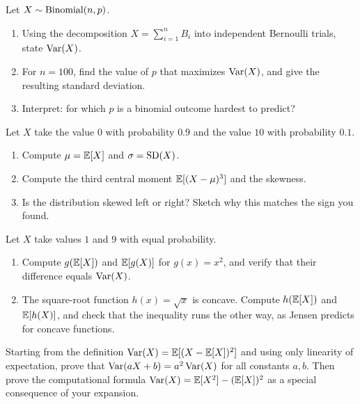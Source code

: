 \begin{exercise}
\label{ch09:exr-binom}
Let $X \sim \operatorname{Binomial}(n,p)$.
\begin{enumerate}
  \item Using the decomposition $X = \sum_{i=1}^n B_i$ into independent
        Bernoulli trials, state $\operatorname{Var}(X)$.
  \item For $n = 100$, find the value of $p$ that maximizes $\operatorname{Var}(X)$, and
        give the resulting standard deviation.
  \item Interpret: for which $p$ is a binomial outcome hardest to predict?
\end{enumerate}
\end{exercise}

\begin{exercise}
\label{ch09:exr-skew}
Let $X$ take the value $0$ with probability $0.9$ and the value $10$ with
probability $0.1$.
\begin{enumerate}
  \item Compute $\mu = \operatorname{\mathbb{E}}[X]$ and $\sigma = \operatorname{SD}(X)$.
  \item Compute the third central moment $\operatorname{\mathbb{E}}[(X-\mu)^3]$ and the skewness.
  \item Is the distribution skewed left or right? Sketch why this matches the
        sign you found.
\end{enumerate}
\end{exercise}

\begin{exercise}
\label{ch09:exr-jensen}
Let $X$ take values $1$ and $9$ with equal probability.
\begin{enumerate}
  \item Compute $g(\operatorname{\mathbb{E}}[X])$ and $\operatorname{\mathbb{E}}[g(X)]$ for $g(x) = x^2$, and verify that
        their difference equals $\operatorname{Var}(X)$.
  \item The square-root function $h(x) = \sqrt x$ is concave. Compute
        $h(\operatorname{\mathbb{E}}[X])$ and $\operatorname{\mathbb{E}}[h(X)]$, and check that the inequality runs the
        other way, as Jensen predicts for concave functions.
\end{enumerate}
\end{exercise}

\begin{exercise}
\label{ch09:exr-proof}
Starting from the definition $\operatorname{Var}(X) = \operatorname{\mathbb{E}}[(X-\operatorname{\mathbb{E}}[X])^2]$ and using only
linearity of expectation, prove that $\operatorname{Var}(aX+b) = a^2\operatorname{Var}(X)$ for all
constants $a,b$. Then prove the computational formula
$\operatorname{Var}(X) = \operatorname{\mathbb{E}}[X^2]-(\operatorname{\mathbb{E}}[X])^2$ as a special consequence of your expansion.
\end{exercise}

